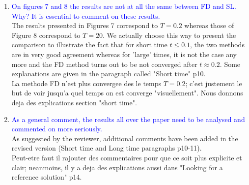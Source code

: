 \documentclass{article}
\begin{document}
\begin{enumerate}
{qualitative comparison. This comment also applies to all the following figures.}\\
The goal of Figures 6 is to illustrate that qualitatively, the results are  in good agreement. In particular, we found interesting to show that 
for relatively short time ($t\leq 0.1)$, the two methods gives very close results, which is not the case for larger time. 
We do not think plotting the difference between FD and SL results will be constructive. Moreover, let us remark that 
the numerical parameters are not the same, so that some errors may affect the diagnostics. \\ %
{\small Le but de la figure 6 est de voir que les resultats sont qualitativement proches. On pourrait effectivement calculer la difference pour avoir des valeurs + quantitatives, mais cela donnera des figues plus petites.
Ce qui nous semblait important c'etait justement de donner qqch juste de visuel et de voir que pour $T=0.1$ on ne voit pas encore de differences.
Il ne faut pas oublier non plus que le nombre de points n'est pas le meme. }
    \item \textcolor{blue}{On figures 7 and 8 the results are not at all the same between FD and SL. Why? It is
essential to comment on these results.} \\
The results presented in Figures 7 correspond to $T=0.2$ whereas those of Figure 8 correspond to $T=20$. 
We actually choose this way to present the comparison to illustrate the fact that for short time $t\leq 0.1$, 
the two methods are in very good agreement whereas for 'large' times, it is not the case any more and the FD method 
turns out to be not converged after $t\approx 0.2$. Some explanations are given in the paragraph called "Short time" p10. \\
{\small La methode FD n'est plus convergee des le temps $T=0.2$; c'est justement le but de voir jusqu'a quel temps on est converge "visuellement". Nous donnons deja des explications section "short time".}
    \item \textcolor{blue}{As a general comment, the results all over the paper need to be analysed and
commented on more seriously. }\\
As suggested by the reviewer, additional comments have been added in the revised version (Short time and Long time paragraphs p10-11). \\
{\small Peut-etre faut il rajouter des commentaires pour que ce soit plus explicite et clair; neanmoins, il y a deja des explications aussi dans "Looking for a reference solution" p14. }

\end{enumerate}
\end{document}
